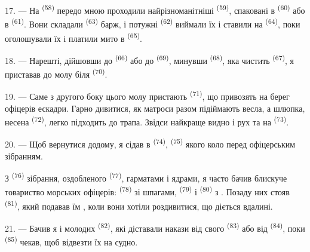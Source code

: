 17. --- На  \textsuperscript{(58)} передо мною проходили
найрізноманітніші  \textsuperscript{(59)}, спаковані в
 \textsuperscript{(60)} або в  \textsuperscript{(61)}.
Вони складали  \textsuperscript{(63)} барж, і потужні
 \textsuperscript{(62)} виймали їх і ставили на
 \textsuperscript{(64)}, поки  оголошували
їх і платили мито в  \textsuperscript{(65)}.

18. --- Нарешті, дійшовши до  \textsuperscript{(66)} або
до  \textsuperscript{(69)}, минувши 
\textsuperscript{(68)}, яка чистить  \textsuperscript{(67)}, я
приставав до молу біля  \textsuperscript{(70)}.

19. --- Саме з другого боку цього молу пристають 
\textsuperscript{(71)}, що привозять на берег офіцерів ескадри. Гарно дивитися,
як матроси разом підіймають весла, а шлюпка, несена 
\textsuperscript{(72)}, легко підходить до трапа. Звідси найкраще видно
 і рух  та  на 
\textsuperscript{(73)}.

\VUsaut{3.0mm}
\VUsaut{3.0mm}

20. --- Щоб вернутися додому, я сідав в 
\textsuperscript{(74)},  \textsuperscript{(75)} якого коло
 перед офіцерським зібранням.

З  \textsuperscript{(76)} зібрання, оздобленого 
\textsuperscript{(77)}, гарматами і ядрами, я часто бачив блискуче товариство
морських офіцерів:  \textsuperscript{(78)} зі шпагами,
 \textsuperscript{(79)} і 
\textsuperscript{(80)} з . Позаду них стояв 
\textsuperscript{(81)}, який подавав їм , коли вони хотіли
роздивитися, що діється вдалині.

21. --- Бачив я і молодих  \textsuperscript{(82)}, які
діставали накази від свого  \textsuperscript{(83)} або від
 \textsuperscript{(84)}, поки 
\textsuperscript{(85)} чекав, щоб відвезти їх на судно.

